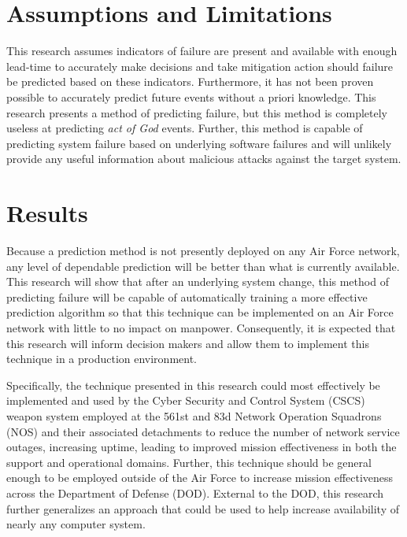 \section{Assumptions and Limitations}
This research assumes indicators of failure are present and available with
enough lead-time to accurately make decisions and take mitigation action should
failure be predicted based on these indicators.  Furthermore, it has not been
proven possible to accurately predict future events without a priori knowledge.
This research presents a method of predicting failure, but this method is
completely useless at predicting \emph{act of God} events.  Further, this
method is capable of predicting system failure based on underlying software
failures and will unlikely provide any useful information about malicious
attacks against the target system.

\section{Results}
Because a prediction method is not presently deployed on any Air Force network,
any level of dependable prediction will be better than what is currently
available.  This research will show that after an underlying system change,
this method of predicting failure will be capable of automatically training a
more effective prediction algorithm so that this technique can be implemented
on an Air Force network with little to no impact on manpower.  Consequently, it
is expected that this research will inform decision makers and allow them to
implement this technique in a production environment.

Specifically, the technique presented in this research could most effectively
be implemented and used by the Cyber Security and Control System (CSCS) weapon
system employed at the 561st and 83d Network Operation Squadrons (NOS) and
their associated detachments to reduce the number of network service outages,
increasing uptime, leading to improved mission effectiveness in both the
support and operational domains.  Further, this technique should be general
enough to be employed outside of the Air Force to increase mission
effectiveness across the Department of Defense (DOD).  External to the DOD,
this research further generalizes an approach that could be used to help
increase availability of nearly any computer system.
